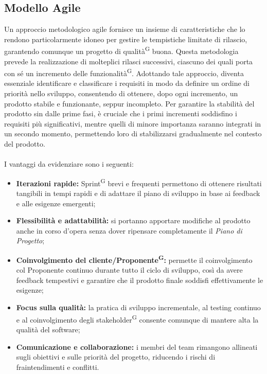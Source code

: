 \documentclass[8pt]{article}
\newcommand{\glossterm}[1]{#1\textsuperscript{G}} %
\begin{document}
\subsection{Modello Agile}
Un approccio metodologico agile fornisce un insieme di caratteristiche che lo rendono particolarmente idoneo per gestire le tempistiche limitate di rilascio, garantendo comunque un progetto di \glossterm{qualità} buona.
Questa metodologia prevede la realizzazione di molteplici rilasci successivi, ciascuno dei quali porta con sé un incremento delle \glossterm{funzionalità}. Adottando tale approccio, diventa essenziale identificare e classificare i requisiti in modo da definire un ordine di priorità nello sviluppo, consentendo di ottenere, dopo ogni incremento, un prodotto stabile e funzionante, seppur incompleto. Per garantire la stabilità del prodotto sin dalle prime fasi, è cruciale che i primi incrementi soddisfino i requisiti più significativi, mentre quelli di minore importanza saranno integrati in un secondo momento, permettendo loro di stabilizzarsi gradualmente nel contesto del prodotto.
\\\\
I vantaggi da evidenziare sono i seguenti:
\begin{itemize}
\setlength\itemsep{0em}
\item
\textbf{Iterazioni rapide:} \glossterm{Sprint} brevi e frequenti permettono di ottenere risultati tangibili in tempi rapidi e di adattare il piano di sviluppo in base ai feedback e alle esigenze emergenti;
\item
\textbf{Flessibilità e adattabilità:} si portanno apportare modifiche al prodotto anche in corso d'opera senza dover ripensare completamente il \textit{Piano di Progetto};
\item
\textbf{Coinvolgimento del cliente/\glossterm{Proponente}:} permette il coinvolgimento col Proponente continuo durante tutto il ciclo di sviluppo, così da avere feedback tempestivi e garantire che il prodotto finale soddisfi effettivamente le esigenze;
\item
\textbf{Focus sulla qualità:} la pratica di sviluppo incrementale, al testing continuo e al coinvolgimento degli \glossterm{stakeholder} consente comunque di mantere alta la qualità del software;
\item
\textbf{Comunicazione e collaborazione:} i membri del team rimangono allineati sugli obiettivi e sulle priorità del progetto, riducendo i rischi di fraintendimenti e conflitti.
\end{itemize}
\newpage
\end{document}
